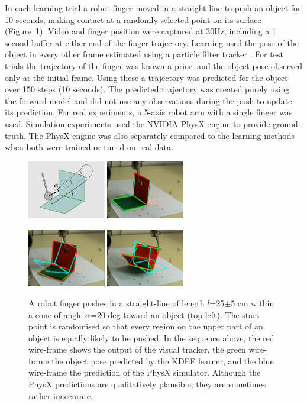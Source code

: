 In each learning trial a robot finger moved in a straight line to push
an object for 10 seconds, making contact at a randomly selected point
on its surface (Figure~\ref{fig:Setup}). Video and finger position were captured at 30Hz, including a 1 second buffer at either end of the finger trajectory. Learning used the pose of the object in every other frame estimated using a particle filter tracker \cite{morwald_edge_2009}. For test trials the trajectory of the finger was known a priori and the object pose observed only at the initial frame. Using these a trajectory was predicted for the object over 150 steps (10 seconds). The predicted trajectory was created purely using the forward model and did not use any observations during the push to update its prediction. For real experiments, a 5-axis robot arm with a single finger was used. Simulation experiments used the NVIDIA PhysX engine to provide ground-truth. The PhysX engine was also separately compared to the learning methods when both were trained or tuned on real data.

\begin{figure}[t]
\centerline{
\includegraphics[width=3.4cm]{training}
\includegraphics[width=3.4cm]{complex1}
}
\centerline{
\includegraphics[width=3.4cm]{complex2}
\includegraphics[width=3.4cm]{complex4}
}
\caption[Setup]{
A robot finger pushes in a straight-line of length $l$=25$\pm$5 cm within a cone of angle $\alpha$=20 deg toward an object (top left). The start point is randomised so that every region on the upper part of an object is equally likely to be pushed. In the sequence above, the red wire-frame shows the output of the visual tracker, the green wire-frame the object pose predicted by the KDEF learner, and the blue wire-frame the prediction of the PhysX simulator. Although the PhysX predictions are qualitatively plausible, they are sometimes rather inaccurate.}
\label{fig:Setup}
\end{figure}

